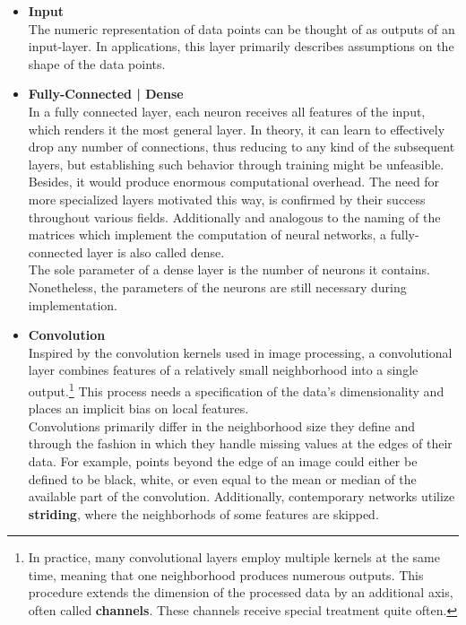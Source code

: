 \begin{itemize}
	\item \textbf{Input}\\
	The numeric representation of data points can be thought of as outputs of an input-layer. In
	applications, this layer primarily describes assumptions on the shape of the data points. \\
	\item \textbf{Fully-Connected | Dense}\\
	In a fully connected layer, each neuron receives all features of the input, which renders it the most general layer.  In theory, it can learn to effectively drop any number of connections, thus reducing to any kind of the subsequent layers, but establishing such behavior through training might be unfeasible. Besides, it would produce enormous computational overhead. The need for more specialized layers motivated this way, is confirmed by their success throughout various fields.
	Additionally and analogous to the naming of the matrices which implement the computation of neural networks, a fully-connected layer is also called dense.\\
	The sole parameter of a dense layer is the number of neurons it contains. Nonetheless, the parameters of the neurons are still necessary during implementation.\\
	\item \textbf{Convolution}\\
	Inspired by the convolution kernels used in image processing, a convolutional layer combines features of a relatively small neighborhood into a single output.\footnote{In practice, many convolutional layers employ multiple kernels at the same time, meaning that one neighborhood produces numerous outputs. This procedure extends the dimension of the processed data by an additional axis, often called \textbf{channels}. These channels receive special treatment quite often.} This process needs a specification of the data's dimensionality and places an implicit bias on local features. \\
	Convolutions primarily differ in the neighborhood size they define and through the fashion in which they handle missing values at the edges of their data. For example, points beyond the edge of an image could either be defined to be black, white, or even equal to the mean or median of the available part of the convolution. Additionally, contemporary networks utilize \textbf{striding}, where the neighborhods of some features are skipped.\\

\end{itemize}
